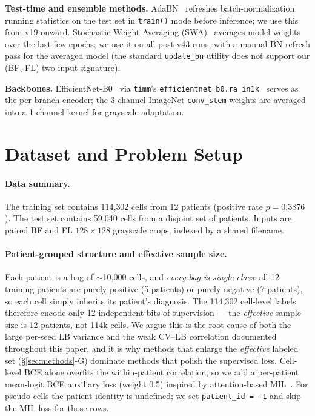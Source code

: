 \documentclass[conference]{IEEEtran}
\begin{document}
\textbf{Test-time and ensemble methods.} AdaBN~\cite{li2016adabn} refreshes batch-normalization running statistics on the test set in \texttt{train()} mode before inference; we use this from v19 onward. Stochastic Weight Averaging (SWA)~\cite{izmailov2018swa} averages model weights over the last few epochs; we use it on all post-v43 runs, with a manual BN refresh pass for the averaged model (the standard \texttt{update\_bn} utility does not support our (BF, FL) two-input signature).

\textbf{Backbones.} EfficientNet-B0~\cite{tan2019efficientnet} via \texttt{timm}'s \texttt{efficientnet\_b0.ra\_in1k}~\cite{wightman2019timm} serves as the per-branch encoder; the 3-channel ImageNet \texttt{conv\_stem} weights are averaged into a 1-channel kernel for grayscale adaptation.

\section{Dataset and Problem Setup}
\label{sec:data}

\paragraph{Data summary.} The training set contains 114{,}302 cells from 12 patients (positive rate $p = 0.3876$). The test set contains 59{,}040 cells from a disjoint set of patients. Inputs are paired BF and FL $128 \times 128$ grayscale crops, indexed by a shared filename.

\paragraph{Patient-grouped structure and effective sample size.} Each patient is a bag of $\sim$10{,}000 cells, and \emph{every bag is single-class}: all 12 training patients are purely positive (5 patients) or purely negative (7 patients), so each cell simply inherits its patient's diagnosis. The 114{,}302 cell-level labels therefore encode only 12 independent bits of supervision --- the \emph{effective} sample size is 12 patients, not 114k cells. We argue this is the root cause of both the large per-seed LB variance and the weak CV--LB correlation documented throughout this paper, and it is why methods that enlarge the \emph{effective} labeled set (\S\ref{sec:methods}-G) dominate methods that polish the supervised loss. Cell-level BCE alone overfits the within-patient correlation, so we add a per-patient mean-logit BCE auxiliary loss (weight 0.5) inspired by attention-based MIL~\cite{ilse2018attentionmil}. For pseudo cells the patient identity is undefined; we set \texttt{patient\_id = -1} and skip the MIL loss for those rows.
\end{document}
